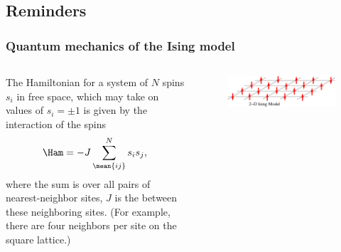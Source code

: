 \documentclass[hyperref={colorlinks=true}]{beamer}
\begin{document}
\subsection[Reminders]{Reminders}
\begin{frame}%
  \frametitle{Quantum mechanics of the Ising model}

  \begin{columns}
  
  
  The Hamiltonian for a system of $N$ spins $s_i$ in free space, which may take on values of $s_i = \pm1$ is given by the interaction of the spins
  \begin{equation}
    \Ham = -J \sum_{\mean{ij}}^N s_i s_{j} , \label{eq:ising-free}
  \end{equation} 
  where the sum  is over all pairs of nearest-neighbor sites, $J$ is the  between these neighboring sites. (For example, there are four neighbors per site on the square lattice.)
  
  \vspace{-0.5cm}
  
    \begin{figure}
      \centering
      \includegraphics[width=0.8\columnwidth]{Ising-spins-2D.png}
    \end{figure}
    
  

\end{columns}
\end{frame}
\end{document}
